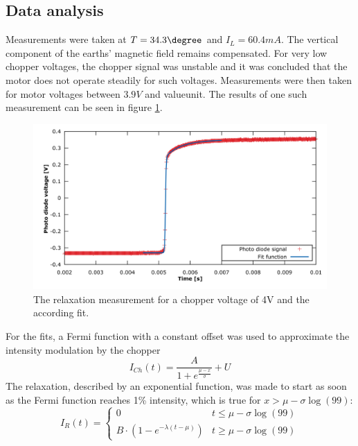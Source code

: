 \subsection{Data analysis}
Measurements were taken at $T=\unit{34.3}{\degree}$ and $I_L=\unit{60.4}{mA}$. The vertical component of the earths' magnetic field remains compensated. For very low chopper voltages, the chopper signal was unstable and it was concluded that the motor does not operate steadily for such voltages. Measurements were then taken for motor voltages between $\unit{3.9}{V}$ and \unit{value}{unit}.
The results of one such measurement can be seen in figure \ref{fig:franzenexample}.\newpage
\begin{figure}[htb]
	\centering
	\includegraphics[width=1.0\linewidth]{graphics/franzenexample}
	\caption[Example of Franzen relaxation]{The relaxation measurement for a chopper voltage of \unit{4}{V} and the according fit.}
	\label{fig:franzenexample}
\end{figure}
For the fits, a Fermi function with a constant offset was used to approximate the intensity modulation by the chopper
\begin{equation}
I_{Ch}(t)=\frac{A}{1+e^{\frac{\mu-x}{\sigma}}}+U
\end{equation}
The relaxation, described by an exponential function, was made to start as soon as the Fermi function reaches 1\% intensity, which is true for $x>\mu-\sigma\log(99)$:
\begin{equation}
	I_R(t)=\begin{cases}
	0 &t\leq\mu-\sigma\log(99)\\
	B\cdot(1-e^{-\lambda(t-\mu)})&t\ge\mu-\sigma\log(99)
	\end{cases}
\end{equation}



